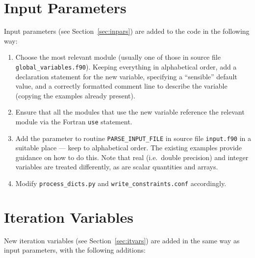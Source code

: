 \documentclass[11pt,a4paper]{report}
\begin{document}
\section{Input Parameters}

Input parameters (see Section~\ref{sec:inpars}) are added to the code in the
following way:

\begin{enumerate}

\item Choose the most relevant module (usually one of those in source file
  \texttt{global\_variables.f90}). Keeping everything in alphabetical order,
  add a declaration statement for the new variable, specifying a ``sensible''
  default value, and a correctly formatted comment line to describe the
  variable (copying the examples already present).

\item Ensure that all the modules that use the new variable reference the
  relevant module via the Fortran \texttt{use} statement.

\item Add the parameter to routine \texttt{PARSE\_INPUT\_FILE} in source file
  \texttt{input.f90} in a suitable place --- keep to alphabetical order. The
  existing examples provide guidance on how to do this. Note that real (i.e.\
  double precision) and integer variables are treated differently, as are
  scalar quantities and arrays.

\item Modify \texttt{process\_dicts.py} and \texttt{write\_constraints.conf}
  accordingly.

\end{enumerate}

\section{Iteration Variables}

New iteration variables (see Section~\ref{sec:itvars}) are added in the
same way as input parameters, with the following additions:
\end{document}
